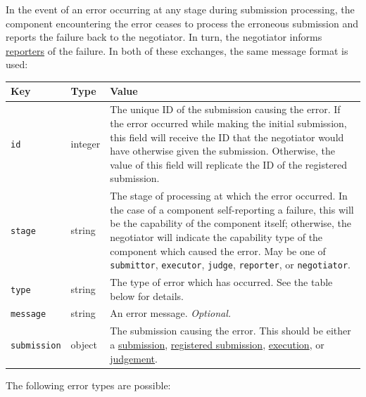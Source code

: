 \documentclass[11pt,letterpaper]{article}
\begin{document}
In the event of an error occurring at any stage during submission processing,
the component encountering the error ceases to process the erroneous submission
and reports the failure back to the negotiator. In turn, the negotiator informs
\hyperref[design-reporter]{reporters} of the failure. In both of these
exchanges, the same message format is used:

\begin{tabulary}{\textwidth}{ | l | l | L | }
    \hline
    \textbf{Key} & \textbf{Type} & \textbf{Value} \\
    \hline
    \texttt{id} & integer & The unique ID of the submission causing the error.
        If the error occurred while making the initial submission, this field
        will receive the ID that the negotiator would have otherwise given the
        submission. Otherwise, the value of this field will replicate the ID of
        the registered submission. \\
    \hline
    \texttt{stage} & string & The stage of processing at which the error
        occurred. In the case of a component self-reporting a failure, this
        will be the capability of the component itself; otherwise, the
        negotiator will indicate the capability type of the component which
        caused the error.
        \newline
        \newline
        May be one of \texttt{submittor}, \texttt{executor}, \texttt{judge},
        \texttt{reporter}, or \texttt{negotiator}. \\
    \hline
    \texttt{type} & string & The type of error which has occurred. See the
        table below for details. \\
    \hline
    \texttt{message} & string & An error message. \emph{Optional.} \\
    \hline
    \texttt{submission} & object & The submission causing the error. This
        should be either a \hyperref[comm-formats-sub]{submission},
        \hyperref[comm-formats-reg-sub]{registered submission},
        \hyperref[comm-formats-exec]{execution}, or
        \hyperref[comm-formats-judge]{judgement}. \\
    \hline
\end{tabulary}

The following error types are possible:
\end{document}
